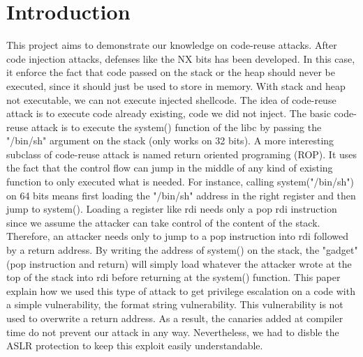 \section{Introduction}
This project aims to demonstrate our knowledge on code-reuse attacks. After code injection attacks, defenses like the NX bits has been developed. In this case, it enforce the fact that code passed on the stack or the heap should never be executed, since it should just be used to store in memory. With stack and heap not executable, we can not execute injected shellcode. The idea of code-reuse attack is to execute code already existing, code we did not inject. The basic code-reuse attack is to execute the system() function of the libc by passing the "/bin/sh" argument on the stack (only works on 32 bits). A more interesting subclass of code-reuse attack is named return oriented programing (ROP). It uses the fact that the control flow can jump in the middle of any kind of existing function to only executed what is needed. For instance, calling system("/bin/sh") on 64 bits means first loading the "/bin/sh" address in the right register and then jump to system(). Loading a register like rdi needs only a pop rdi instruction since we assume the attacker can take control of the content of the stack. Therefore, an attacker needs only to jump to a pop instruction into rdi followed by a return address. By writing the address of system() on the stack, the "gadget" (pop instruction and return) will simply load whatever the attacker wrote at the top of the stack into rdi before returning at the system() function.
This paper explain how we used this type of attack to get privilege escalation on a code with a simple vulnerability, the format string vulnerability. This vulnerability is not used to overwrite a return address. As a result, the canaries added at compiler time do not prevent our attack in any way. Nevertheless, we had to disble the ASLR protection to keep this exploit easily understandable.
